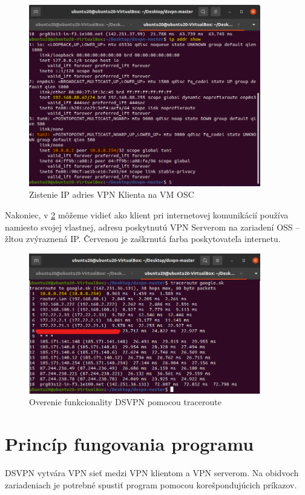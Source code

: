 \begin{figure}
	\centering
	\includegraphics[width=0.9\textwidth]{figures/ipu20}
	\caption{Zistenie IP adries VPN Klienta na VM OSC}
	\label{ipu20}
\end{figure}
Nakoniec, v \ref{vpntru20} môžeme vidieť ako klient pri internetovej komunikácií používa namiesto svojej vlastnej, adresu poskytnutú VPN Serverom na zariadení OSS -- žltou zvýraznená IP. Červenou je zaškrnutá farba poskytovateľa internetu. 

\begin{figure}
	\centering
	\includegraphics[width=0.9\textwidth]{figures/vpntru20}
	\caption{Overenie funkcionality DSVPN pomocou traceroute}
	\label{vpntru20}
\end{figure}
\section{Princíp fungovania programu}
DSVPN vytvára VPN sieť medzi VPN klientom a VPN serverom. Na obidvoch zariadeniach je potrebné spustiť program pomocou korešpondujúcich príkazov. 


